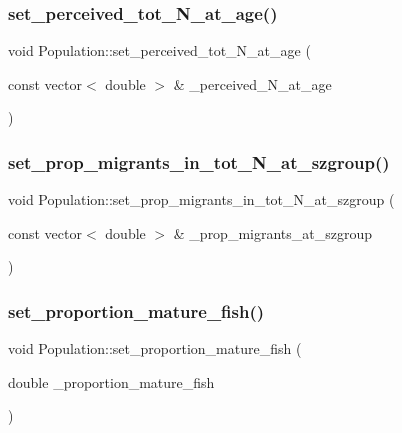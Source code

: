 \mbox{\label{class_population_a0b0d9da60bfdf7f5130bfccaacb5a701}} 
\subsubsection{\texorpdfstring{set\_perceived\_tot\_N\_at\_age()}{set\_perceived\_tot\_N\_at\_age()}}
{\footnotesize\ttfamily void Population\+::set\+\_\+perceived\+\_\+tot\+\_\+\+N\+\_\+at\+\_\+age (\begin{DoxyParamCaption}\item[{const vector$<$ double $>$ \&}]{\+\_\+perceived\+\_\+\+N\+\_\+at\+\_\+age }\end{DoxyParamCaption})}

\mbox{\label{class_population_abb9b63e8de5e4f35e07267cdf318a8f3}} 
\subsubsection{\texorpdfstring{set\_prop\_migrants\_in\_tot\_N\_at\_szgroup()}{set\_prop\_migrants\_in\_tot\_N\_at\_szgroup()}}
{\footnotesize\ttfamily void Population\+::set\+\_\+prop\+\_\+migrants\+\_\+in\+\_\+tot\+\_\+\+N\+\_\+at\+\_\+szgroup (\begin{DoxyParamCaption}\item[{const vector$<$ double $>$ \&}]{\+\_\+prop\+\_\+migrants\+\_\+at\+\_\+szgroup }\end{DoxyParamCaption})}

\mbox{\label{class_population_a89e01ecdc70dc056b177e9fddf97fd97}} 
\subsubsection{\texorpdfstring{set\_proportion\_mature\_fish()}{set\_proportion\_mature\_fish()}}
{\footnotesize\ttfamily void Population\+::set\+\_\+proportion\+\_\+mature\+\_\+fish (\begin{DoxyParamCaption}\item[{double}]{\+\_\+proportion\+\_\+mature\+\_\+fish }\end{DoxyParamCaption})}

